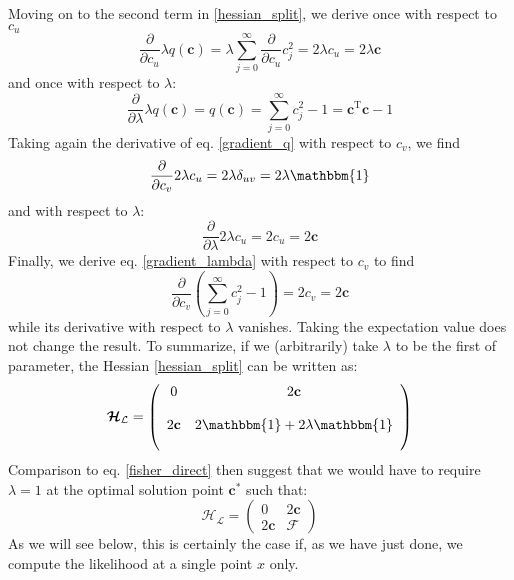 \documentclass[]{report}
\begin{document}
		Moving on to the second term in \ref{hessian_split}, we derive once with respect to $c_u$
		\begin{equation}\label{gradient_q}
			\frac{\partial}{\partial c_u}\lambda q(\mathbf{c}) = \lambda\sum_{j=0}^{\infty}\frac{\partial}{\partial c_u}c_j^2 = 2\lambda c_u = 2\lambda\mathbf{c}
		\end{equation}
		and once with respect to $\lambda$:
		\begin{equation}\label{gradient_lambda}
			\frac{\partial}{\partial\lambda}\lambda q(\mathbf{c}) = q(\mathbf{c})	= \sum_{j=0}^{\infty}c_j^2 - 1 = \mathbf{c}^\mathrm{T}\mathbf{c} - 1
		\end{equation}
		Taking again the derivative of eq. \ref{gradient_q} with respect to $c_v$, we find
		\begin{equation}
			\frac{\partial}{\partial c_v}2\lambda c_u = 2\lambda\delta_{uv} = 2\lambda\mathbbm{1}
		\end{equation}
		and with respect to $\lambda$:
		\begin{equation}
			\frac{\partial}{\partial\lambda}2\lambda c_u = 2c_u = 2\mathbf{c}
		\end{equation}
		Finally, we derive eq. \ref{gradient_lambda} with respect to $c_v$ to find
		\begin{equation}
			\frac{\partial}{\partial c_v}\left(\sum_{j=0}^{\infty}c_j^2 - 1 \right) = 2c_v = 2\mathbf{c}
		\end{equation}
		while its derivative with respect to $\lambda$ vanishes. Taking the expectation value does not change the result. To summarize, if we (arbitrarily) take $\lambda$ to be the first of parameter, the Hessian \ref{hessian_split} can be written as:
		\begin{equation}\label{hessian_lagrangian}
			\bm{\mathcal{H}}_\mathcal{L} = \left(
			\begin{array}{cc}
				0 & 2\mathbf{c} \\
				  &  \\
				2\mathbf{c} & 2\mathbbm{1} + 2\lambda\mathbbm{1} \\
				  &  
			\end{array} \right)
		\end{equation}
		Comparison to eq. \ref{fisher_direct} then suggest that we would have to require $\lambda = 1$ at the optimal solution point $\mathbf{c}^*$ such that:
		\begin{equation}
			\bm{\mathcal{H}}_\mathcal{L} = \left(
			\begin{array}{cc}
				0 & 2\mathbf{c} \\
				2\mathbf{c} & \bm{\mathcal{F}}
			\end{array} \right)
		\end{equation}
		As we will see below, this is certainly the case if, as we have just done, we compute the likelihood at a single point $x$ only.
		
\end{document}
